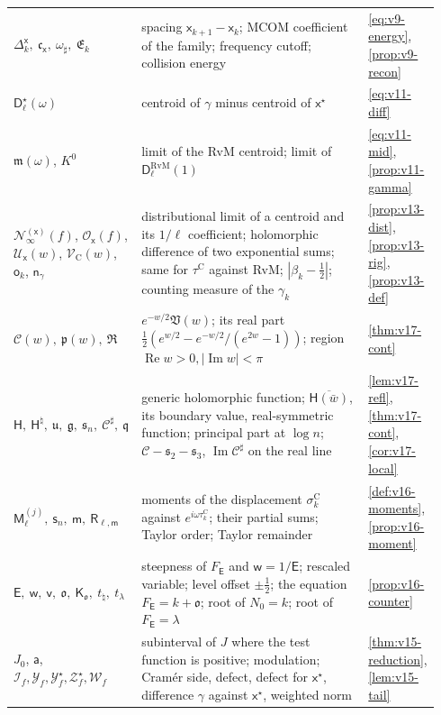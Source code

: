\documentclass[11pt,a4paper]{article}
\numberwithin{equation}{section}
\theoremstyle{definition}
\theoremstyle{remark}
\begin{document}
\begin{longtable}{@{}p{0.22\linewidth}p{0.56\linewidth}p{0.16\linewidth}@{}}
$\Delta_k^{\mathsf x},\ \mathfrak c_{\mathsf x},\ \omega_\sharp,\ \mathfrak E_k$ & spacing $\mathsf x_{k+1}-\mathsf x_k$; MCOM coefficient of the family; frequency cutoff; collision energy & \eqref{eq:v9-energy}, \cref{prop:v9-recon}\\
$\mathsf D_\ell^\star(\omega)$ & centroid of $\gamma$ minus centroid of $\mathsf x^\star$ & \eqref{eq:v11-diff}\\
$\mathfrak m(\omega)$, $K^0$ & limit of the RvM centroid; limit of $\mathsf D_\ell^{\mathrm{RvM}}(1)$ & \eqref{eq:v11-mid}, \cref{prop:v11-gamma}\\
$\mathscr N_\infty^{(\mathsf x)}(f)$, $\mathscr O_{\mathsf x}(f)$, $\mathscr U_{\mathsf x}(w)$, $\mathscr V_{\mathrm C}(w)$, $\mathsf o_k$, $\mathsf n_\gamma$ & distributional limit of a centroid and its $1/\ell$ coefficient; holomorphic difference of two exponential sums; same for $\tau^{\mathrm C}$ against RvM; $|\beta_k-\frac12|$; counting measure of the $\gamma_k$ & \cref{prop:v13-dist}, \cref{prop:v13-rig}, \cref{prop:v13-def}\\
$\mathscr C(w),\ \mathfrak p(w),\ \mathfrak R$ & $e^{-w/2}\mathfrak V(w)$; its real part $\frac12(e^{w/2}-e^{-w/2}/(e^{2w}-1))$; region $\operatorname{Re}w>0,|\operatorname{Im}w|<\pi$ & \cref{thm:v17-cont}\\
$\mathsf H,\ \mathsf H^\natural,\ \mathfrak u,\ \mathfrak g,\ \mathfrak s_n,\ \mathscr C^\sharp,\ \mathfrak q$ & generic holomorphic function; $\overline{\mathsf H(\bar w)}$, its boundary value, real-symmetric function; principal part at $\log n$; $\mathscr C-\mathfrak s_2-\mathfrak s_3$, $\operatorname{Im}\mathscr C^\sharp$ on the real line & \cref{lem:v17-refl}, \cref{thm:v17-cont}, \cref{cor:v17-local}\\
$\mathsf M_\ell^{(j)},\ \mathsf s_n,\ \mathsf m,\ \mathsf R_{\ell,\mathsf m}$ & moments of the displacement $\sigma_k^{\mathrm C}$ against $e^{i\omega\tau_k^{\mathrm C}}$; their partial sums; Taylor order; Taylor remainder & \cref{def:v16-moments}, \cref{prop:v16-moment}\\
$\mathsf E,\ \mathsf w,\ \mathsf v,\ \mathfrak o,\ \mathsf K_{\mathfrak o},\ t_\natural,\ t_\lambda$ & steepness of $F_{\mathsf E}$ and $\mathsf w=1/\mathsf E$; rescaled variable; level offset $\pm\frac12$; the equation $F_{\mathsf E}=k+\mathfrak o$; root of $N_0=k$; root of $F_{\mathsf E}=\lambda$ & \cref{prop:v16-counter}\\
$J_0$, $\mathsf a$, $\mathscr I_f,\mathscr Y_f,\mathscr Y_f^\star,\mathscr Z_f^\star,\mathscr W_f$ & subinterval of $J$ where the test function is positive; modulation; Cram\'er side, defect, defect for $\mathsf x^\star$, difference $\gamma$ against $\mathsf x^\star$, weighted norm & \cref{thm:v15-reduction}, \cref{lem:v15-tail}\\

\end{longtable}
\end{document}

